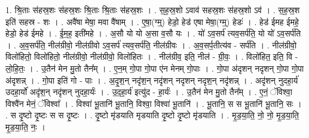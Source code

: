 \documentclass[17pt]{extarticle}
\begin{document}
1. श्रि॒ताः स॑हस्र॒शः स॑हस्र॒शः श्रि॒ताः श्रि॒ताः स॑हस्र॒शः । . स॒ह॒स्र॒शो ऽवाव॑ सहस्र॒शः स॑हस्र॒शो ऽव॑ । . स॒ह॒स्र॒श इति॑ सहस्र - शः । . अवै॑षा मेषा॒ मवा वै॑षाम् । . ए॒षा॒(ग्म्॒) हेडो॒ हेड॑ एषा मेषा॒(ग्म्॒) हेडः॑ । . हेड॑ ईमह ईमहे॒ हेडो॒ हेड॑ ईमहे । . ई॒म॒ह॒ इती॑महे । . अ॒सौ यो यो अ॒सा व॒सौ यः । . यो॑ ऽव॒सर्प॑ त्यव॒सर्प॑ति॒ यो यो॑ ऽव॒सर्प॑ति । . अ॒व॒सर्प॑ति॒ नील॑ग्रीवो॒ नील॑ग्रीवो ऽव॒सर्प॑ त्यव॒सर्प॑ति॒ नील॑ग्रीवः । . अ॒व॒सर्प॒तीत्य॑व - सर्प॑ति । . नील॑ग्रीवो॒ विलो॑हितो॒ विलो॑हितो॒ नील॑ग्रीवो॒ नील॑ग्रीवो॒ विलो॑हितः । . नील॑ग्रीव॒ इति॒ नील॑ - ग्री॒वः॒ । . विलो॑हित॒ इति॒ वि - लो॒हि॒तः॒ । . उ॒तैन॑ मेन मु॒तो तैन᳚म् । . ए॒न॒म् गो॒पा गो॒पा ए॑न मेनम् गो॒पाः । . गो॒पा अ॑दृशन् नदृशन् गो॒पा गो॒पा अ॑दृशन्न् । . गो॒पा इति॑ गो - पाः । . अ॒दृ॒श॒न् नदृ॑श॒न् नदृ॑शन् नदृशन् नदृश॒न् नदृ॑शन्न् । . अदृ॑शन् नुदहा॒र्य॑ उदहा॒र्यो॑ अदृ॑श॒न् नदृ॑शन् नुदहा॒र्यः॑ । . उ॒द॒हा॒र्य॑ इत्यु॑द - हा॒र्यः॑ । . उ॒तैन॑ मेन मु॒तो तैन᳚म् । . ए॒नं॒ ॅविश्वा॒ विश्वै॑न मेनं॒ ॅविश्वा᳚ । . विश्वा॑ भू॒तानि॑ भू॒तानि॒ विश्वा॒ विश्वा॑ भू॒तानि॑ । . भू॒तानि॒ स स भू॒तानि॑ भू॒तानि॒ सः । . स दृ॒ष्टो दृ॒ष्टः स स दृ॒ष्टः । . दृ॒ष्टो मृ॑डयाति मृडयाति दृ॒ष्टो दृ॒ष्टो मृ॑डयाति । . मृ॒ड॒या॒ति॒ नो॒ नो॒ मृ॒ड॒या॒ति॒ मृ॒ड॒या॒ति॒ नः॒ । \newline
\end{document}
